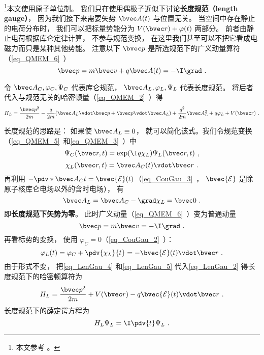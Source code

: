 

\footnote{本文参考 \cite{Bransden}。}本文使用原子单位制。 我们只在使用偶极子近似下讨论\textbf{长度规范（length gauge）}， 因为我们接下来需要矢势 $\bvec A(t)$ 与位置无关。 当空间中存在静止的电荷分布时， 我们可以把标量势能分为 $V(\bvec r) + \varphi(t)$ 两部分。 前者由静止电荷根据库仑定律计算， 不参与规范变换， 在这里我们甚至可以不把它看成电磁力而只是某种其他势能。
注意以下 $\bvec p$ 是所选规范下的广义动量算符（\autoref{eq_QMEM_6}~）
\begin{equation}
\bvec p = m \bvec v + q\bvec A(t) = -\I \grad~.
\end{equation}

令 $\bvec A_C, \varphi_C, \Psi_C$ 代表库仑规范， $\bvec A_L, \varphi_L, \Psi_L$ 代表长度规范。 将后者代入与规范无关的哈密顿量（\autoref{eq_QMEM_2}~）得
\begin{equation}\label{eq_LenGau_2}
H_L = \frac{\bvec p^2}{2m} - \frac{q}{2m} (\bvec A_L \vdot \bvec p + \bvec p \vdot \bvec A_L) + \frac{q^2}{2m} \bvec A_L^2 + q \varphi_L + V(\bvec r)~.
\end{equation}


长度规范的思路是： 如果使 $\bvec A_L \equiv 0$， 就可以简化该式。我们令规范变换（\autoref{eq_QMEM_5}~和\autoref{eq_QMEM_3}~）中
\begin{equation}\label{eq_LenGau_1}
\Psi_C(\bvec r, t) = \exp(\I q\chi_L)\Psi_L(\bvec r, t)~,
\end{equation}
\begin{equation}
\chi_L(\bvec r, t) = \bvec A_C(t) \vdot \bvec r~.
\end{equation}
再利用 $-\pdv*{\bvec A_C}{t} = \bvec {\mathcal E}(t)$（\autoref{eq_CouGau_3}~， $\bvec {\mathcal E}$ 是除原子核库仑电场以外的含时电场）， 有
\begin{equation}\label{eq_LenGau_4}
\bvec A_L = \bvec A_C - \grad \chi_L = \bvec 0~.
\end{equation}
即\textbf{长度规范下矢势为零}。 此时广义动量（\autoref{eq_QMEM_6}~）变为普通动量
\begin{equation}\label{eq_LenGau_6}
\bvec p = m \bvec v = -\I \grad~.
\end{equation}
再看标势的变换， 使用 $\varphi_C = 0$（\autoref{eq_CouGau_2}~）：
\begin{equation}\label{eq_LenGau_5}
\varphi_L(t) = \varphi_C + \pdv{\chi_L}{t} = -\bvec {\mathcal E}(t) \vdot \bvec r~.
\end{equation}
由于形式不变， 把\autoref{eq_LenGau_4} 和\autoref{eq_LenGau_5} 代入\autoref{eq_LenGau_2} 得长度规范下的哈密顿算符为
\begin{equation}\label{eq_LenGau_7}
H_L = \frac{\bvec p^2}{2m} + V(\bvec r) - q\bvec{\mathcal{E}}(t) \vdot \bvec r~.
\end{equation}
长度规范下的薛定谔方程为
\begin{equation}\label{eq_LenGau_3}
H_L \Psi_L = \I \pdv{t} \Psi_L~.
\end{equation}

